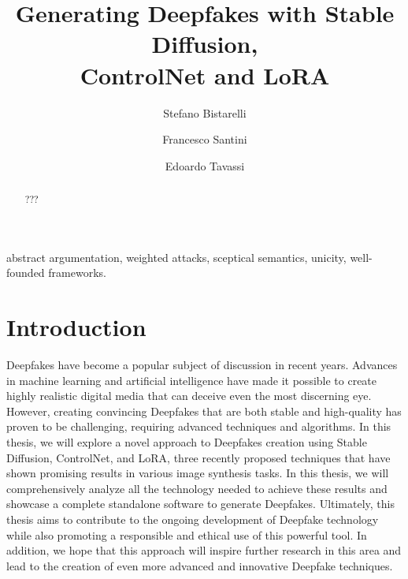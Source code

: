 \documentclass[preprint]{elsarticle}
\begin{document}
\begin{frontmatter}


\title{Generating Deepfakes with Stable Diffusion,\\ ControlNet and LoRA}





\author[perugia]{Stefano Bistarelli}
\author[perugia]{Francesco Santini}
\author[perugia]{Edoardo Tavassi}


\address[perugia]{Dipartimento di Matematica e  Informatica, University of Perugia, Italy}




\begin{abstract} 
???
\end{abstract}

\begin{keyword}
abstract argumentation, weighted attacks, sceptical semantics, unicity, well-founded frameworks.
\end{keyword}
\end{frontmatter}



\section{Introduction}


Deepfakes have become a popular subject of discussion in recent years. 
Advances in machine learning and artificial intelligence have made it possible to 
create highly realistic digital media that can deceive even the most discerning eye. 
However, creating convincing Deepfakes that are both stable and high-quality has proven 
to be challenging, requiring advanced techniques and algorithms. 
In this thesis, we will explore a novel approach to Deepfakes creation using 
Stable Diffusion, ControlNet, and LoRA, three recently proposed techniques that 
have shown promising results in various image synthesis tasks. 
In this thesis, we will comprehensively analyze all the technology needed to achieve these 
results and showcase a complete standalone software to generate Deepfakes. 
Ultimately, this thesis aims to contribute to the ongoing development of 
Deepfake technology while also promoting a responsible and ethical use of this powerful tool. 
In addition, we hope that this approach will inspire further research in this area and 
lead to the creation of even more advanced and innovative Deepfake techniques.
\end{document}
